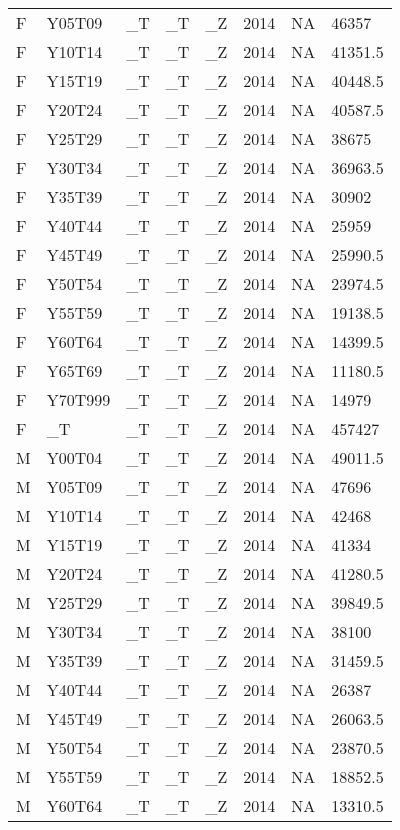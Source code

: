 \begin{longtable}[t]{llllllll}
F & Y05T09 & \_T & \_T & \_Z & 2014 & NA & 46357\\
\addlinespace
F & Y10T14 & \_T & \_T & \_Z & 2014 & NA & 41351.5\\
F & Y15T19 & \_T & \_T & \_Z & 2014 & NA & 40448.5\\
F & Y20T24 & \_T & \_T & \_Z & 2014 & NA & 40587.5\\
F & Y25T29 & \_T & \_T & \_Z & 2014 & NA & 38675\\
F & Y30T34 & \_T & \_T & \_Z & 2014 & NA & 36963.5\\
\addlinespace
F & Y35T39 & \_T & \_T & \_Z & 2014 & NA & 30902\\
F & Y40T44 & \_T & \_T & \_Z & 2014 & NA & 25959\\
F & Y45T49 & \_T & \_T & \_Z & 2014 & NA & 25990.5\\
F & Y50T54 & \_T & \_T & \_Z & 2014 & NA & 23974.5\\
F & Y55T59 & \_T & \_T & \_Z & 2014 & NA & 19138.5\\
\addlinespace
F & Y60T64 & \_T & \_T & \_Z & 2014 & NA & 14399.5\\
F & Y65T69 & \_T & \_T & \_Z & 2014 & NA & 11180.5\\
F & Y70T999 & \_T & \_T & \_Z & 2014 & NA & 14979\\
F & \_T & \_T & \_T & \_Z & 2014 & NA & 457427\\
M & Y00T04 & \_T & \_T & \_Z & 2014 & NA & 49011.5\\
\addlinespace
M & Y05T09 & \_T & \_T & \_Z & 2014 & NA & 47696\\
M & Y10T14 & \_T & \_T & \_Z & 2014 & NA & 42468\\
M & Y15T19 & \_T & \_T & \_Z & 2014 & NA & 41334\\
M & Y20T24 & \_T & \_T & \_Z & 2014 & NA & 41280.5\\
M & Y25T29 & \_T & \_T & \_Z & 2014 & NA & 39849.5\\
\addlinespace
M & Y30T34 & \_T & \_T & \_Z & 2014 & NA & 38100\\
M & Y35T39 & \_T & \_T & \_Z & 2014 & NA & 31459.5\\
M & Y40T44 & \_T & \_T & \_Z & 2014 & NA & 26387\\
M & Y45T49 & \_T & \_T & \_Z & 2014 & NA & 26063.5\\
M & Y50T54 & \_T & \_T & \_Z & 2014 & NA & 23870.5\\
\addlinespace
M & Y55T59 & \_T & \_T & \_Z & 2014 & NA & 18852.5\\
M & Y60T64 & \_T & \_T & \_Z & 2014 & NA & 13310.5\\

\end{longtable}
